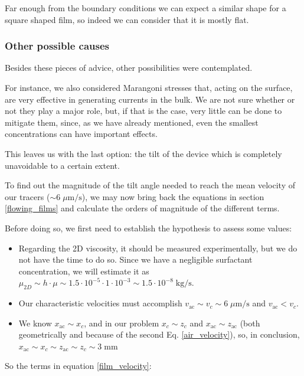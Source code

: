 Far enough from the boundary conditions we can expect a similar shape for a square shaped film, so indeed we can consider that it is mostly flat.

\subsubsection{Other possible causes}

Besides these pieces of advice, other possibilities were contemplated.

For instance, we also considered Marangoni stresses that, acting on the surface, are very effective in generating currents in the bulk. We are not sure whether or not they play a major role, but, if that is the case, very little can be done to mitigate them, since, as we have already mentioned, even the smallest concentrations can have important effects.

This leaves us with the last option: the tilt of the device which is completely unavoidable to a certain extent.

To find out the magnitude of the tilt angle needed to reach the mean velocity of our tracers ($\sim 6 \; \mu \textrm{m/s}$), we may now bring back the equations in section \ref{flowing_films} and calculate the orders of magnitude of the different terms. 

Before doing so, we first need to establish the hypothesis to assess some values:

\begin{itemize}
	\item Regarding the 2D viscosity, it should be measured experimentally, but we do not have the time to do so. Since we have a negligible surfactant concentration, we will estimate it as $\mu_{2D} \sim h \cdot \mu \sim 1.5\cdot 10^{-5} \cdot 1\cdot 10^{-3} \sim 1.5\cdot 10^{-8} \; \textrm{kg/s}$.
	\item Our characteristic velocities must accomplish $ v_{\mathrm{ac}} \sim v_c \sim 6 \; \mu \textrm{m/s}$ and $ v_{\mathrm{ac}} < v_c $.
	\item We know $x_{\mathrm{ac}} \sim x_c$, and in our problem $ x_c \sim z_c $ and $ x_{\mathrm{ac}} \sim z_{\mathrm{ac}} $ (both geometrically and because of the second Eq. \ref{air_velocity}), so, in conclusion, $ x_{\mathrm{ac}} \sim x_c \sim z_{\mathrm{ac}} \sim z_c \sim 3 \; \textrm{mm}$
	
\end{itemize}

So the terms in equation \ref{film_velocity}:

